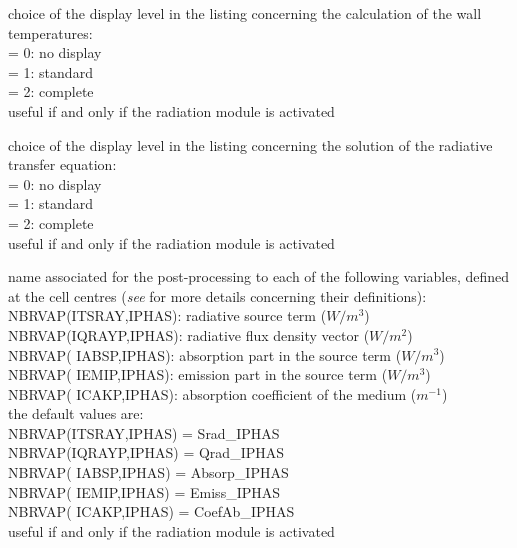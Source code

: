 {choice of the display level in the listing concerning the calculation of
the wall temperatures:\\
\hspace*{1.3cm}= 0: no display\\
\hspace*{1.3cm}= 1: standard\\
\hspace*{1.3cm}= 2: complete\\
useful if and only if the radiation module is activated}

{choice of the display level in the listing concerning the solution of
the radiative transfer equation:\\
\hspace*{1.3cm}= 0: no display\\
\hspace*{1.3cm}= 1: standard\\
\hspace*{1.3cm}= 2: complete\\
useful if and only if the radiation module is activated}

{name associated for the post-processing to each of the following variables,
defined at the cell centres ({\it see}
\cite{Douce02} for more details concerning their definitions):\\ 
\hspace*{1.3cm} NBRVAP(ITSRAY,IPHAS): radiative source term ($W/m^3$)\\
\hspace*{1.3cm} NBRVAP(IQRAYP,IPHAS): radiative flux density vector ($W/m^2$)\\
\hspace*{1.3cm} NBRVAP( IABSP,IPHAS): absorption part in the source term
($W/m^3$)\\ 
\hspace*{1.3cm} NBRVAP( IEMIP,IPHAS): emission part in the source term
($W/m^3$)\\ 
\hspace*{1.3cm} NBRVAP( ICAKP,IPHAS): absorption coefficient of the
medium ($m^{-1}$)\\ 
the default values are: \\
\hspace*{1.3cm} NBRVAP(ITSRAY,IPHAS) = Srad\_IPHAS \\
\hspace*{1.3cm} NBRVAP(IQRAYP,IPHAS) = Qrad\_IPHAS \\
\hspace*{1.3cm} NBRVAP( IABSP,IPHAS) = Absorp\_IPHAS \\
\hspace*{1.3cm} NBRVAP( IEMIP,IPHAS) = Emiss\_IPHAS \\
\hspace*{1.3cm} NBRVAP( ICAKP,IPHAS) = CoefAb\_IPHAS \\
useful if and only if the radiation module is activated}

